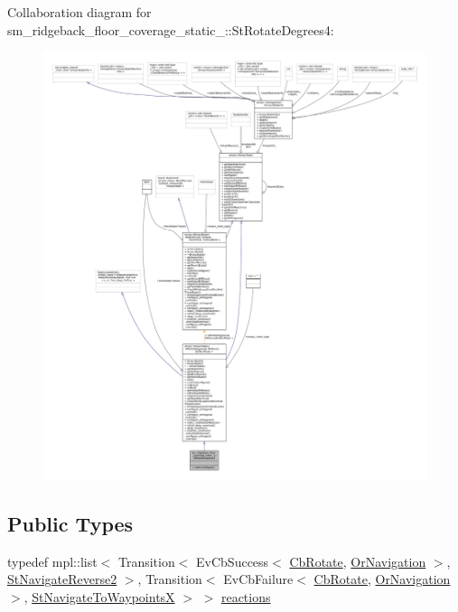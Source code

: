 Collaboration diagram for sm\+\_\+ridgeback\+\_\+floor\+\_\+coverage\+\_\+static\+\_\+:\+:St\+Rotate\+Degrees4\+:
\nopagebreak
\begin{figure}[H]
\begin{center}
\leavevmode
\includegraphics[width=350pt]{structsm__ridgeback__floor__coverage__static__1_1_1StRotateDegrees4__coll__graph}
\end{center}
\end{figure}
\subsection*{Public Types}
\begin{DoxyCompactItemize}
\item 
typedef mpl\+::list$<$ Transition$<$ Ev\+Cb\+Success$<$ \hyperlink{classcl__move__base__z_1_1CbRotate}{Cb\+Rotate}, \hyperlink{classsm__ridgeback__floor__coverage__static__1_1_1OrNavigation}{Or\+Navigation} $>$, \hyperlink{structsm__ridgeback__floor__coverage__static__1_1_1StNavigateReverse2}{St\+Navigate\+Reverse2} $>$, Transition$<$ Ev\+Cb\+Failure$<$ \hyperlink{classcl__move__base__z_1_1CbRotate}{Cb\+Rotate}, \hyperlink{classsm__ridgeback__floor__coverage__static__1_1_1OrNavigation}{Or\+Navigation} $>$, \hyperlink{structsm__ridgeback__floor__coverage__static__1_1_1StNavigateToWaypointsX}{St\+Navigate\+To\+WaypointsX} $>$ $>$ \hyperlink{structsm__ridgeback__floor__coverage__static__1_1_1StRotateDegrees4_acc34071c53dec7d5b7a61250da3a23f6}{reactions}
\end{DoxyCompactItemize}
